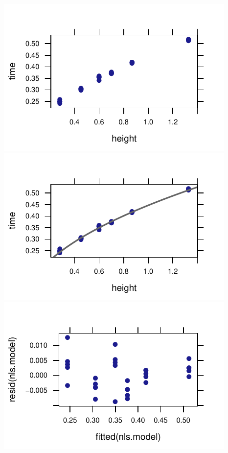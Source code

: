 \documentclass[twoside]{book}\usepackage[]{graphicx}\usepackage[]{xcolor}
\makeatletter
\def\maxwidth{ %
  \ifdim\Gin@nat@width>\linewidth
    \linewidth
  \else
    \Gin@nat@width
  \fi
}
\newenvironment{knitrout}{}{} %
\makeatother
\begin{document}
\begin{solution}
\begin{knitrout}
{\centering \includegraphics[width=\maxwidth]{figures/fig-unnamed-chunk-228-1} 
\includegraphics[width=\maxwidth]{figures/fig-unnamed-chunk-228-2} 
\includegraphics[width=\maxwidth]{figures/fig-unnamed-chunk-228-3} 
}
\end{knitrout}
\end{solution}
\end{document}
